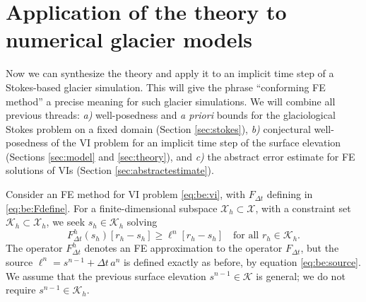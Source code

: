 \documentclass[hidelinks,onefignum,onetabnum,final]{siamart220329}  %
\newcommand{\cK}{\mathcal{K}}
\newcommand{\cX}{\mathcal{X}}
\begin{document}
\section{Application of the theory to numerical glacier models} \label{sec:application}

Now we can synthesize the theory and apply it to an implicit time step of a Stokes-based glacier simulation.  This will give the phrase ``conforming FE method'' a precise meaning for such glacier simulations.  We will combine all previous threads: \emph{a)} well-posedness and \emph{a priori} bounds for the glaciological Stokes problem on a fixed domain (Section \ref{sec:stokes}), \emph{b)} conjectural well-posedness of the VI problem for an implicit time step of the surface elevation (Sections \ref{sec:model} and \ref{sec:theory}), and \emph{c)} the abstract error estimate for FE solutions of VIs (Section \ref{sec:abstractestimate}).

Consider an FE method for VI problem \eqref{eq:be:vi}, with $F_{\Delta t}$ defining in \eqref{eq:be:Fdefine}.  For a finite-dimensional subspace $\cX_h\subset \cX$, with a constraint set $\cK_h\subset \cX_h$, we seek $s_h\in\cK_h$ solving
\begin{equation}
F^h_{\Delta t}(s_h)[r_h-s_h] \ge \ell^n[r_h-s_h] \quad \text{for all } r_h \in \cK_h. \label{eq:fe:be:vi}
\end{equation}
The operator $F^h_{\Delta t}$ denotes an FE approximation to the operator $F_{\Delta t}$, but the source $\ell^n = s^{n-1} + \Delta t\,a^n$ is defined exactly as before, by equation \eqref{eq:be:source}.  We assume that the previous surface elevation $s^{n-1} \in \cK$ is general; we do not require $s^{n-1}\in\cK_h$.
\end{document}
